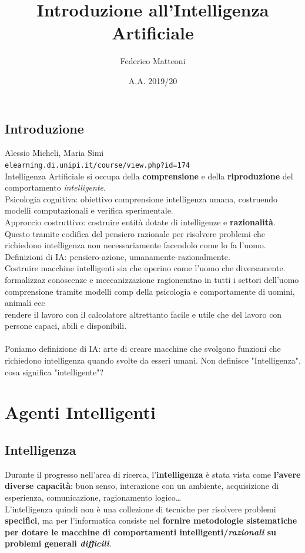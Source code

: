 \documentclass[10pt]{book}
\begin{document}
\renewcommand*\contentsname{Indice}
\title{Introduzione all'Intelligenza Artificiale}
\author{Federico Matteoni}
\date{A.A. 2019/20}
\maketitle
\tableofcontents
\pagebreak
\section*{Introduzione}
Alessio Micheli, Maria Simi\\
\texttt{elearning.di.unipi.it/course/view.php?id=174}\\
Intelligenza Artificiale si occupa della \textbf{comprensione} e della \textbf{riproduzione} del comportamento \textit{intelligente}.\\
Psicologia cognitiva: obiettivo comprensione intelligenza umana, costruendo modelli computazionali e verifica sperimentale.\\
Approccio costruttivo: costruire entità dotate di intelligenze e \textbf{razionalità}. Questo tramite codifica del pensiero razionale per risolvere problemi che richiedono intelligenza non necessariamente facendolo come lo fa l'uomo.\\
Definizioni di IA: pensiero-azione, umanamente-razionalmente.\\
Costruire macchine intelligenti sia che operino come l'uomo che diversamente.\\
formalizzaz conoscenze e meccanizzazione ragionemtno in tutti i settori dell'uomo\\
comprensione tramite modelli comp della psicologia e comportamente di uomini, animali ecc\\
rendere il lavoro con il calcolatore altrettanto facile e utile che del lavoro con persone capaci, abili e disponibili.\\\\
Poniamo definizione di IA: arte di creare macchine che svolgono funzioni che richiedono intelligenza quando svolte da esseri umani. Non definisce "Intelligenza", cosa significa "intelligente"?\\

\chapter{Agenti Intelligenti}
\section{Intelligenza}
Durante il progresso nell'area di ricerca, l'\textbf{intelligenza} è stata vista come \textbf{l'avere diverse capacità}: buon senso, interazione con un ambiente, acquisizione di esperienza, comunicazione, ragionamento logico\ldots\\
L'intelligenza quindi non è una collezione di tecniche per risolvere problemi \textbf{specifici}, ma per l'informatica consiste nel \textbf{fornire metodologie sistematiche per dotare le macchine di comportamenti intelligenti/\textit{razionali} su problemi generali \textit{difficili}}.
\end{document}
